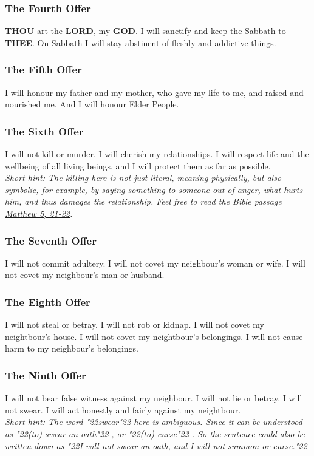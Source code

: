 \documentclass[12pt,a4paper]{article}
\newcommand{\God}[0]{\textbf{GOD}}
\newcommand{\Lord}[0]{\textbf{LORD}}
\newcommand{\Thee}[0]{\textbf{THEE}}
\newcommand{\Thou}[0]{\textbf{THOU}}
\newcommand{\q}[1]{\char"22{#1}\char"22 }
\begin{document}
	\subsubsection{The Fourth Offer}
		{\Thou} art the {\Lord},
		my {\God}.
		I will sanctify and keep the Sabbath to {\Thee}.
		On Sabbath I will stay abstinent of fleshly
		and addictive things.
		
	\subsubsection{The Fifth Offer}
		I will honour my father and my mother,
		who gave my life to me,
		and raised and nourished me.
		And I will honour Elder People.
			
	\subsubsection{The Sixth Offer} \label{TheSixthOffer}
		I will not kill or murder.
		I will cherish my relationships.
		I will respect life and the wellbeing of all living beings,
		and I will protect them as far as possible.
		\\
		\textit{Short hint:
		The killing here is not just literal,
		meaning physically,
		but also symbolic,
		for example,
		by saying something to someone out of anger,
		what hurts him,
		and thus damages the relationship.
		Feel free to read the Bible passage \href{https://www.die-bibel.de/bibeln/online-bibeln/lesen/ESV/MAT.5/Matthew-5}{Matthew 5, 21-22}.}
		
	\subsubsection{The Seventh Offer}
		I will not commit adultery.
		I will not covet my neighbour's woman or wife.
		I will not covet my neighbour's man or husband.
		
	\subsubsection{The Eighth Offer}
		I will not steal or betray.
		I will not rob or kidnap.
		I will not covet my neightbour's house.
		I will not covet my neightbour's belongings.
		I will not cause harm to my neighbour's belongings.
		
	\subsubsection{The Ninth Offer} \label{TheNinthOffer}
		I will not bear false witness against my neighbour.
		I will not lie or betray.
		I will not swear.
		I will act honestly and fairly against my neightbour.
		\\
		\textit{Short hint:
		The word \q{swear} here is ambiguous.
		Since it can be understood as \q{(to) swear an oath},
		or \q{(to) curse}.
		So the sentence could also be written down as
		\q{I will not swear an oath, and I will not summon or curse.}}
		
\end{document}
